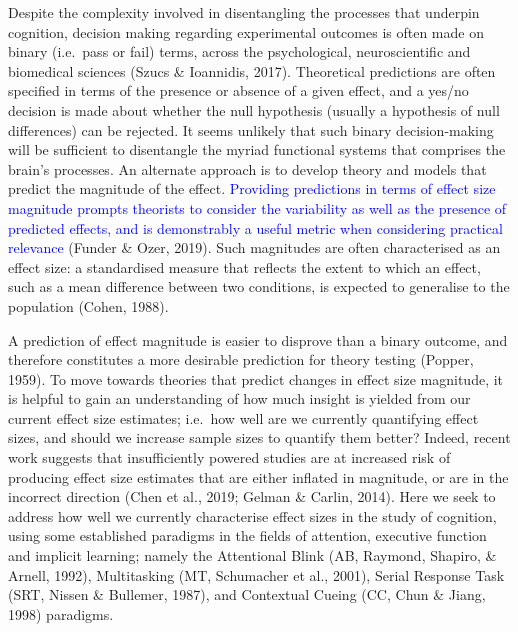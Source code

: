 \documentclass[
  man]{apa6}
\begin{document}
Despite the complexity involved in disentangling the processes that underpin cognition, decision making regarding experimental outcomes is often made on binary (i.e.~pass or fail) terms, across the psychological, neuroscientific and biomedical sciences (Szucs \& Ioannidis, 2017). Theoretical predictions are often specified in terms of the presence or absence of a given effect, and a yes/no decision is made about whether the null hypothesis (usually a hypothesis of null differences) can be rejected. It seems unlikely that such binary decision-making will be sufficient to disentangle the myriad functional systems that comprises the brain's processes. An alternate approach is to develop theory and models that predict the magnitude of the effect. \textcolor{blue}{Providing predictions in terms of effect size magnitude prompts theorists to consider the variability as well as the presence of predicted effects, and is demonstrably a useful metric when considering practical relevance} (Funder \& Ozer, 2019). Such magnitudes are often characterised as an effect size: a standardised measure that reflects the extent to which an effect, such as a mean difference between two conditions, is expected to generalise to the population (Cohen, 1988).

A prediction of effect magnitude is easier to disprove than a binary outcome, and therefore constitutes a more desirable prediction for theory testing (Popper, 1959). To move towards theories that predict changes in effect size magnitude, it is helpful to gain an understanding of how much insight is yielded from our current effect size estimates; i.e.~how well are we currently quantifying effect sizes, and should we increase sample sizes to quantify them better? Indeed, recent work suggests that insufficiently powered studies are at increased risk of producing effect size estimates that are either inflated in magnitude, or are in the incorrect direction (Chen et al., 2019; Gelman \& Carlin, 2014). Here we seek to address how well we currently characterise effect sizes in the study of cognition, using some established paradigms in the fields of attention, executive function and implicit learning; namely the Attentional Blink (AB, Raymond, Shapiro, \& Arnell, 1992), Multitasking (MT, Schumacher et al., 2001), Serial Response Task (SRT, Nissen \& Bullemer, 1987), and Contextual Cueing (CC, Chun \& Jiang, 1998) paradigms.
\end{document}
